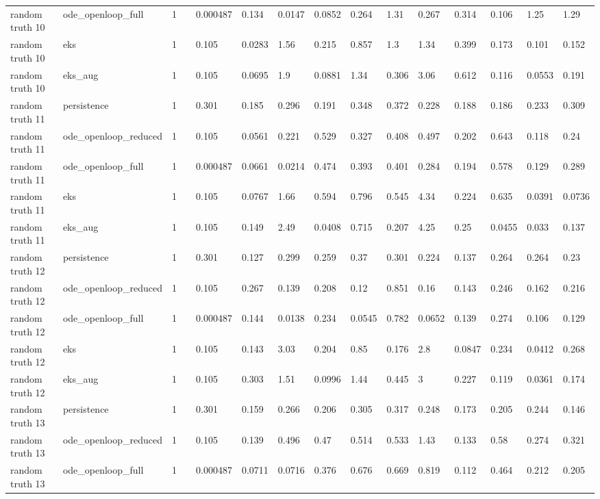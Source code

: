 \begin{table}[t]
\begin{tabular}{lllllllllllllll}
random truth 10 & ode\_openloop\_full & 1 &  & 0.000487 & 0.134 & 0.0147 & 0.0852 & 0.264 & 1.31 & 0.267 & 0.314 & 0.106 & 1.25 & 1.29 \\
random truth 10 & eks & 1 &  & 0.105 & 0.0283 & 1.56 & 0.215 & 0.857 & 1.3 & 1.34 & 0.399 & 0.173 & 0.101 & 0.152 \\
random truth 10 & eks\_aug & 1 &  & 0.105 & 0.0695 & 1.9 & 0.0881 & 1.34 & 0.306 & 3.06 & 0.612 & 0.116 & 0.0553 & 0.191 \\
random truth 11 & persistence & 1 &  & 0.301 & 0.185 & 0.296 & 0.191 & 0.348 & 0.372 & 0.228 & 0.188 & 0.186 & 0.233 & 0.309 \\
random truth 11 & ode\_openloop\_reduced & 1 &  & 0.105 & 0.0561 & 0.221 & 0.529 & 0.327 & 0.408 & 0.497 & 0.202 & 0.643 & 0.118 & 0.24 \\
random truth 11 & ode\_openloop\_full & 1 &  & 0.000487 & 0.0661 & 0.0214 & 0.474 & 0.393 & 0.401 & 0.284 & 0.194 & 0.578 & 0.129 & 0.289 \\
random truth 11 & eks & 1 &  & 0.105 & 0.0767 & 1.66 & 0.594 & 0.796 & 0.545 & 4.34 & 0.224 & 0.635 & 0.0391 & 0.0736 \\
random truth 11 & eks\_aug & 1 &  & 0.105 & 0.149 & 2.49 & 0.0408 & 0.715 & 0.207 & 4.25 & 0.25 & 0.0455 & 0.033 & 0.137 \\
random truth 12 & persistence & 1 &  & 0.301 & 0.127 & 0.299 & 0.259 & 0.37 & 0.301 & 0.224 & 0.137 & 0.264 & 0.264 & 0.23 \\
random truth 12 & ode\_openloop\_reduced & 1 &  & 0.105 & 0.267 & 0.139 & 0.208 & 0.12 & 0.851 & 0.16 & 0.143 & 0.246 & 0.162 & 0.216 \\
random truth 12 & ode\_openloop\_full & 1 &  & 0.000487 & 0.144 & 0.0138 & 0.234 & 0.0545 & 0.782 & 0.0652 & 0.139 & 0.274 & 0.106 & 0.129 \\
random truth 12 & eks & 1 &  & 0.105 & 0.143 & 3.03 & 0.204 & 0.85 & 0.176 & 2.8 & 0.0847 & 0.234 & 0.0412 & 0.268 \\
random truth 12 & eks\_aug & 1 &  & 0.105 & 0.303 & 1.51 & 0.0996 & 1.44 & 0.445 & 3 & 0.227 & 0.119 & 0.0361 & 0.174 \\
random truth 13 & persistence & 1 &  & 0.301 & 0.159 & 0.266 & 0.206 & 0.305 & 0.317 & 0.248 & 0.173 & 0.205 & 0.244 & 0.146 \\
random truth 13 & ode\_openloop\_reduced & 1 &  & 0.105 & 0.139 & 0.496 & 0.47 & 0.514 & 0.533 & 1.43 & 0.133 & 0.58 & 0.274 & 0.321 \\
random truth 13 & ode\_openloop\_full & 1 &  & 0.000487 & 0.0711 & 0.0716 & 0.376 & 0.676 & 0.669 & 0.819 & 0.112 & 0.464 & 0.212 & 0.205 \\

\end{tabular}
\end{table}
